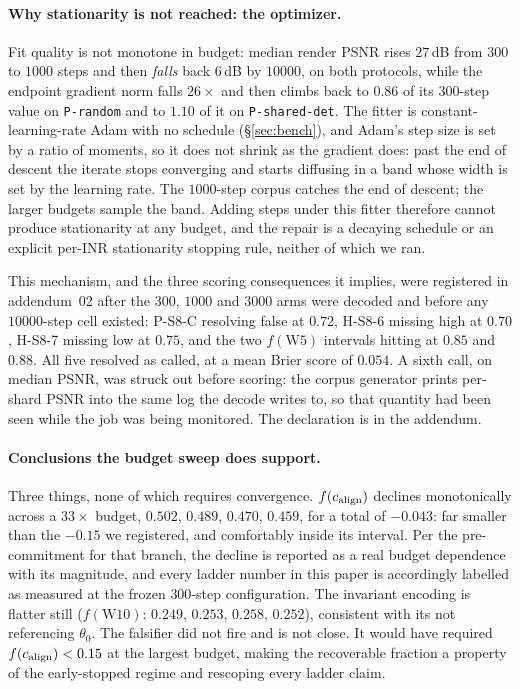 \paragraph{Why stationarity is not reached: the optimizer.} Fit
quality is not monotone in budget: median render PSNR rises $27$\,dB from $300$ to $1000$ steps and
then \emph{falls} back $6$\,dB by $10000$, on both protocols, while the endpoint gradient norm falls
$26\times$ and then climbs back to $0.86$ of its $300$-step value on \texttt{P-random} and to
$1.10$ of it on \texttt{P-shared-det}. The fitter is constant-learning-rate Adam
with no schedule (\S\ref{sec:bench}), and Adam's step size is set by a ratio of moments, so it
does not shrink as the gradient does: past the end of descent the iterate stops converging and
starts diffusing in a band whose width is set by the learning rate. The $1000$-step corpus catches
the end of descent; the larger budgets sample the band. Adding steps under this fitter therefore
cannot produce stationarity at any budget, and the repair is a decaying schedule or an explicit
per-INR stationarity stopping rule, neither of which we ran.

This mechanism, and the three scoring consequences it implies, were registered in addendum~02 after
the $300$, $1000$ and $3000$ arms were decoded and before any $10000$-step cell existed: P-S8-C
resolving false at $0.72$, H-S8-6 missing high at $0.70$, H-S8-7 missing low at $0.75$, and the two
$f(\mathrm{W5})$ intervals hitting at $0.85$ and $0.88$. All five resolved as called, at a mean
Brier score of $0.054$. A sixth call, on median PSNR, was struck out
before scoring: the corpus generator prints per-shard PSNR into the same log the decode writes to,
so that quantity had been seen while the job was being monitored. The declaration is in the
addendum.

\paragraph{Conclusions the budget sweep does support.} Three things, none of which requires convergence.
$f(c_{\mathrm{align}})$ declines monotonically across a $33\times$ budget, $0.502$, $0.489$, $0.470$,
$0.459$, for a total of $\mathbf{-0.043}$: far smaller than the $-0.15$ we registered, and
comfortably inside its interval. Per the pre-commitment for that branch, the decline is reported as a real
budget dependence with its magnitude, and every ladder number in this paper is accordingly labelled
as measured at the frozen $300$-step configuration. The invariant encoding is flatter still
($f(\mathrm{W10})$: $0.249$, $0.253$, $0.258$, $0.252$), consistent with its not referencing
$\theta_0$. The falsifier did not fire and is not close. It would have required $f(c_{\mathrm{align}}) < 0.15$ at the
largest budget, making the recoverable fraction a property of the early-stopped regime and
rescoping every ladder claim.

